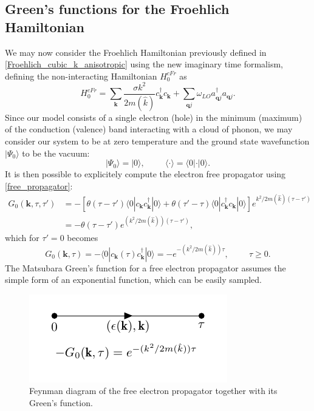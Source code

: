 \subsection{Green's functions for the Froehlich Hamiltonian}
We may now consider the Froehlich Hamiltonian previously defined in \ref{Froehlich_cubic_k_anisotropic} using the new imaginary time formalism,
defining the non-interacting Hamiltonian $H^{cFr}_0$ as 
\begin{equation}
    H^{cFr}_0=\sum_\mathbf{k}\frac{\sigma k^2}{2m(\hat{k})}c^\dagger_{\mathbf{k}}c_\mathbf{k}+\sum_{\mathbf{q}j}\omega_{LO}a^\dagger_{\mathbf{q}j}a_{\mathbf{q}j}.
    \label{polaron_non-interacting}
\end{equation}
Since our model consists of a single electron (hole) in the minimum (maximum) of the conduction (valence) band interacting with a cloud of phonon, we may 
consider our system to be at zero temperature and the ground state wavefunction $|\Psi_0\rangle$ to be the vacuum:
\begin{equation}
    |\Psi_0\rangle=|0\rangle,\hspace{1cm}\langle \cdot \rangle=\langle 0|\cdot|0\rangle.
\end{equation}
It is then possible to explicitely compute the electron free propagator using \ref{free_propagator}:
\begin{equation}
\begin{split}
    G_0(\mathbf{k},\tau,\tau')&=-\left[\theta(\tau-\tau')\langle 0| c_\mathbf{k}c^\dagger_\mathbf{k}|0\rangle+\theta(\tau'-\tau)\langle 0 | c^\dagger_\mathbf{k}c_\mathbf{k}|0\rangle\right]e^{k^2/2m(\hat{k})(\tau-\tau')}\\
    &=-\theta(\tau-\tau')e^{(k^2/2m(\hat{k}))(\tau-\tau')},
\end{split}
\end{equation}
which for $\tau'=0$ becomes
\begin{equation}
    G_0(\mathbf{k},\tau)=-\langle 0|c_{\mathbf{k}}(\tau)c^\dagger_\mathbf{k}|0\rangle =-e^{-(k^2/2m(\hat{k}))\tau},\hspace{1cm}\tau\ge0.
\end{equation}
The Matsubara Green's function for a free electron propagator assumes the simple form of an exponential function, which can be easily sampled.
\begin{figure}[H]
    \centering
    \includegraphics[scale=1]{free_el_propagator.pdf}
    \caption{Feynman diagram of the free electron propagator together with its Green's function.}
    \label{fig:el_prop_free}
\end{figure}
